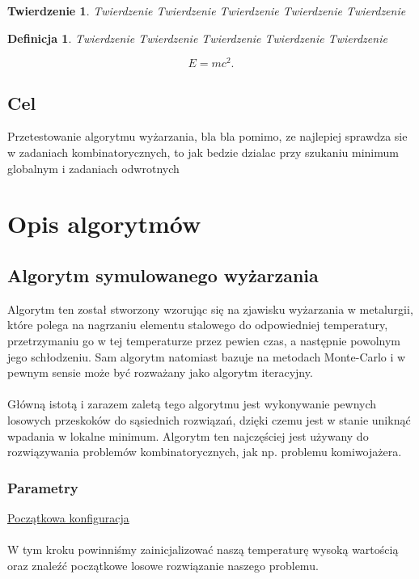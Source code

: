 \documentclass[twoside]{projektInzynierskiMS1}
\newcommand{\newLine}{~\\}
\newcommand{\si}{ś}
\newtheorem{tw}{Twierdzenie}%
\newtheorem{dd}{Definicja}%
\begin{document}
\begin{tw}
Twierdzenie Twierdzenie Twierdzenie Twierdzenie Twierdzenie 
\end{tw}

\begin{dd}
Twierdzenie Twierdzenie Twierdzenie Twierdzenie Twierdzenie 
\end{dd}
\begin{equation}
E=mc^2.
\end{equation}
\subsection{Cel}
	Przetestowanie algorytmu wyżarzania, bla bla 
pomimo, ze najlepiej sprawdza sie w zadaniach kombinatorycznych, to jak bedzie dzialac przy szukaniu minimum globalnym i zadaniach odwrotnych


\section{Opis algorytmów}
	\subsection{Algorytm symulowanego wyżarzania}
				Algorytm ten został stworzony wzorując się na zjawisku wyżarzania w metalurgii, które polega na nagrzaniu elementu stalowego do odpowiedniej temperatury, przetrzymaniu go w tej temperaturze przez pewien czas, a następnie powolnym jego schłodzeniu. Sam algorytm natomiast bazuje na metodach Monte-Carlo i w pewnym sensie może być rozważany jako algorytm iteracyjny.\\ \newLine
Główną istotą i zarazem zaletą tego algorytmu jest wykonywanie pewnych losowych przeskoków do sąsiednich rozwiązań, dzięki czemu jest w stanie uniknąć wpadania w lokalne minimum. Algorytm ten najczę\si ciej jest używany do rozwiązywania problemów kombinatorycznych, jak np. problemu komiwojażera.
		\subsubsection{Parametry}
		


\noindent \underline{Początkowa konfiguracja} \\ \newLine
\indent W tym kroku powinniśmy zainicjalizować naszą temperaturę wysoką wartością oraz znaleźć początkowe losowe rozwiązanie naszego problemu. 
\\ \newLine
\end{document}
